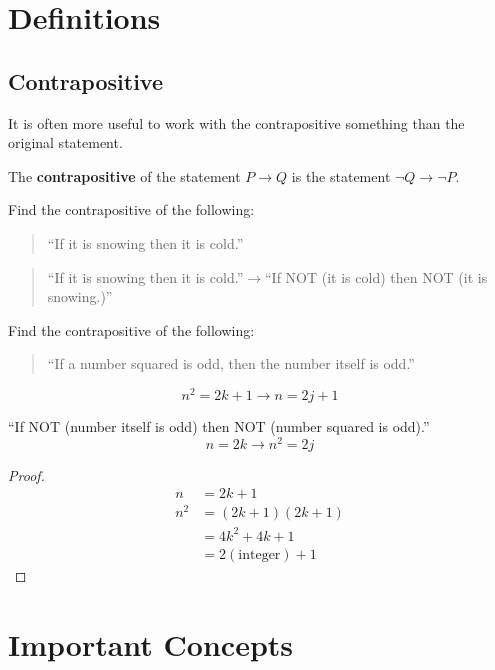 \chapter{Definitions}

\section{Contrapositive}\label{app:def:contrapositive}\date{26 March 2012}

It is often more useful to work with the contrapositive something than the original statement.

\begin{defn}
  The \textbf{contrapositive} of the statement \(P \to Q \) is the statement \(\neg Q \to \neg P\).
\end{defn}


\begin{ex}
  Find the contrapositive of the following:
  \begin{quote}
    ``If it is snowing then it is cold.''
  \end{quote}
  \begin{sol}
    \begin{quote}
      ``If it is snowing then it is cold.''\(\to\)``If NOT (it is cold) then NOT (it is snowing.)''
    \end{quote}
  \end{sol}
\end{ex}
\begin{ex}
  Find the contrapositive of the following:
  \begin{quote}
    ``If a number squared is odd, then the number itself is odd.''
  \end{quote}
  \[ n^2=2k+1\to n=2j+1 \]
  \begin{sol}
    ``If NOT (number itself is odd) then NOT (number squared is odd).''
    \[n=2k \to n^2 = 2j \]
    \begin{proof}
      \begin{align*}
        n &=2k+1 \\
        n^2 &= (2k+1)(2k+1) \\
        &= 4k^2+4k+1 \\
        &= 2(\text{integer})+1
      \end{align*}
    \end{proof}
  \end{sol}
\end{ex}

\chapter{Important Concepts}

